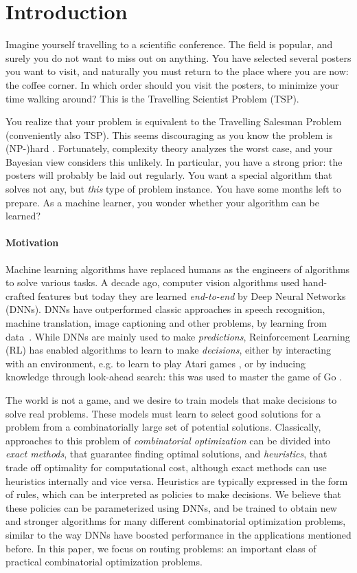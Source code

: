 \section{Introduction}
Imagine yourself travelling to a scientific conference. The field is popular, and surely you do not want to miss out on anything. You have selected several posters you want to visit, and naturally you must return to the place where you are now: the coffee corner. In which order should you visit the posters, to minimize your time walking around? This is the Travelling Scientist Problem (TSP).

You realize that your problem is equivalent to the Travelling Salesman Problem (conveniently also TSP). This seems discouraging as you know the problem is (NP-)hard \citep{garey1979computers}. Fortunately, complexity theory analyzes the worst case, and your Bayesian view considers this unlikely. In particular, you have a strong prior: the posters will probably be laid out regularly. You want a special algorithm that solves not any, but \emph{this} type of problem instance. You have some months left to prepare. As a machine learner, you wonder whether your algorithm can be learned?

\paragraph{Motivation}
Machine learning algorithms have replaced humans as the engineers of algorithms to solve various tasks. A decade ago, computer vision algorithms used hand-crafted features but today they are learned \emph{end-to-end} by Deep Neural Networks (DNNs). DNNs have outperformed classic approaches in speech recognition, machine translation, image captioning and other problems, by learning from data~\citep{lecun2015deep}. While DNNs are mainly used to make \emph{predictions}, Reinforcement Learning (RL) has enabled algorithms to learn to make \emph{decisions}, either by interacting with an environment, e.g. to learn to play Atari games \citep{mnih2015human}, or by inducing knowledge through look-ahead search: this was used to master the game of Go \citep{silver2017mastering}.

The world is not a game, and we desire to train models that make decisions to solve real problems. These models must learn to select good solutions for a problem from a combinatorially large set of potential solutions. Classically, approaches to this problem of \emph{combinatorial optimization} can be divided into \emph{exact methods}, that guarantee finding optimal solutions, and \emph{heuristics}, that trade off optimality for computational cost, although exact methods can use heuristics internally and vice versa. Heuristics are typically expressed in the form of rules, which can be interpreted as policies to make decisions. We believe that these policies can be parameterized using DNNs, and be trained to obtain new and stronger algorithms for many different combinatorial optimization problems, similar to the way DNNs have boosted performance in the applications mentioned before.
In this paper, we focus on routing problems: an important class of practical combinatorial optimization problems.

